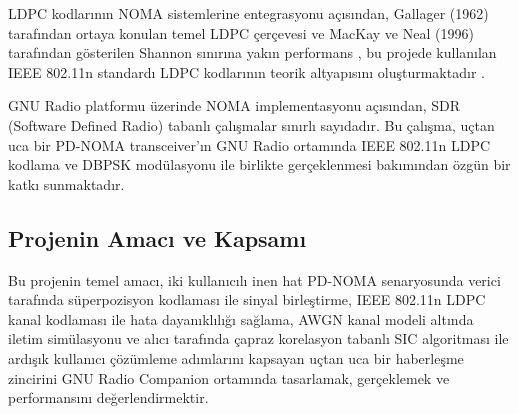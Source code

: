 LDPC kodlarının NOMA sistemlerine entegrasyonu açısından, Gallager (1962) tarafından ortaya konulan temel LDPC çerçevesi \cite{gallager1962low} ve MacKay ve Neal (1996) tarafından gösterilen Shannon sınırına yakın performans \cite{mackay1996near}, bu projede kullanılan IEEE 802.11n standardı LDPC kodlarının teorik altyapısını oluşturmaktadır \cite{ieee200980211n}.

GNU Radio platformu üzerinde NOMA implementasyonu açısından, SDR (Software Defined Radio) tabanlı çalışmalar sınırlı sayıdadır. Bu çalışma, uçtan uca bir PD-NOMA transceiver'ın GNU Radio ortamında IEEE 802.11n LDPC kodlama ve DBPSK modülasyonu ile birlikte gerçeklenmesi bakımından özgün bir katkı sunmaktadır.

\subsection{Projenin Amacı ve Kapsamı}
Bu projenin temel amacı, iki kullanıcılı inen hat PD-NOMA senaryosunda verici tarafında süperpozisyon kodlaması ile sinyal birleştirme, IEEE 802.11n LDPC kanal kodlaması ile hata dayanıklılığı sağlama, AWGN kanal modeli altında iletim simülasyonu ve alıcı tarafında çapraz korelasyon tabanlı SIC algoritması ile ardışık kullanıcı çözümleme adımlarını kapsayan uçtan uca bir haberleşme zincirini GNU Radio Companion ortamında tasarlamak, gerçeklemek ve performansını değerlendirmektir.
